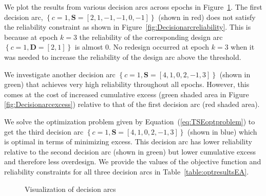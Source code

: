 We plot the results from various decision arcs across epochs in Figure~\ref{fig:epocheraexample}. The first decision arc, $\left\{c=1,\mathbf{S}=\left[2,1,-1,-1,0,-1\right]\right\}$ (shown in red) does not satisfy the reliability constraint as shown in Figure~\ref{fig:Decisionarcreliability}. This is because at epoch $k=3$ the reliability of the corresponding design arc $\left\{c=1,\mathbf{D}=\left[2,1\right]\right\}$ is almost 0. No redesign occurred at epoch $k=3$ when it was needed to increase the reliability of the design arc above the threshold.

We investigate another decision arc $\left\{c=1,\mathbf{S}=\left[4,1,0,2,-1,3\right]\right\}$ (shown in green) that achieves very high reliability throughout all epochs. However, this comes at the cost of increased cumulative excess (green shaded area in Figure \ref{fig:Decisionarcexcess}) relative to that of the first decision arc (red shaded area). %

We solve the optimization problem given by Equation~(\ref{eq:TSEoptproblem}) to get the third decision arc $\left\{c=1,\mathbf{S}=\left[4,1,0,2,-1,3\right]\right\}$ (shown in blue) which is optimal in terms of minimizing excess. This decision arc has lower reliability relative to the second decision arc (shown in green) but lower cumulative excess and therefore less overdesign. We provide the values of the objective function and reliability constraints for all three decision arcs in Table~\ref{table:optresultsEA}.

\begin{figure}[h!]
	\centering
	 \hspace{0.1\textwidth}%
	 \hspace{0.1\textwidth}%
	\caption{Visualization of decision arcs}
	\label{fig:epocheraexample}
\end{figure}

\newcommand{\ocwa}{0.75cm} %
\newcommand{\ocwb}{4cm} %
\newcommand{\ocwc}{1.5cm} %
\newcommand{\ocwd}{2cm} %
\newcommand{\ocwe}{3cm} %

